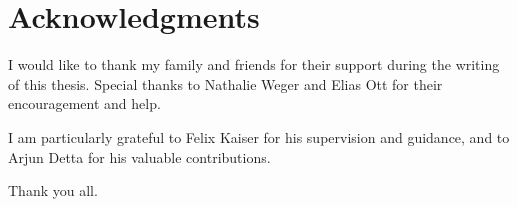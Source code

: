 \chapter*{Acknowledgments}

I would like to thank my family and friends for their support during the writing of this thesis. Special thanks to Nathalie Weger and Elias Ott for their encouragement and help.

I am particularly grateful to Felix Kaiser for his supervision and guidance, and to Arjun Detta for his valuable contributions.

Thank you all.

